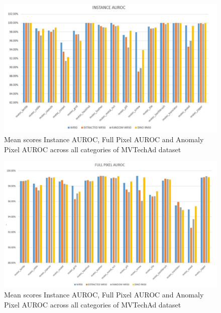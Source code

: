 \begin{figure}[h]
	\begin{center}
		\includegraphics[width=1.0\linewidth]{Chapter_4/wd_instance.png}
	\end{center}
	\caption{Mean scores Instance AUROC, Full Pixel AUROC and Anomaly Pixel AUROC across all categories of MVTechAd dataset}
	\label{fig:wd_instance}
\end{figure}

\begin{figure}[h]
	\begin{center}
		\includegraphics[width=1.0\linewidth]{Chapter_4/wd_full_pixel.png}
	\end{center}
	\caption{Mean scores Instance AUROC, Full Pixel AUROC and Anomaly Pixel AUROC across all categories of MVTechAd dataset}
	\label{fig:wd_full_pixel}
\end{figure}

